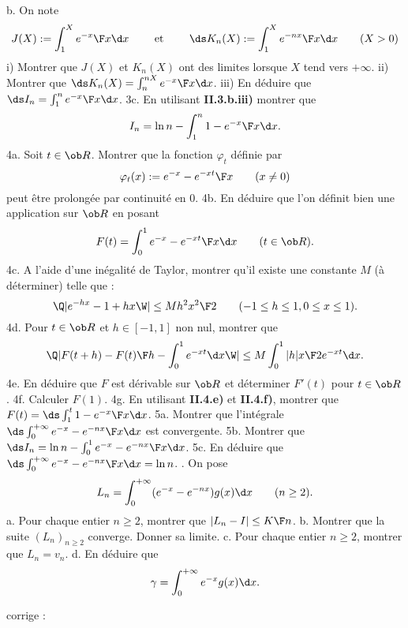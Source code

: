 \smallskip
\noindent
b. On note 
$$
J(X):=\int_1^X{e^{-x}\F x}\d x\qquad\mbox{ et } \qquad\ds K_n(X):=\int_1^X{e^{-nx}\F x}\d x\qquad(X>0)
$$
i) Montrer que $J(X)$ et $K_n(X)$ ont des limites lorsque $X$ tend vers $+\infty$.
\smallskip
\noindent
ii) Montrer que $\ds K_n(X)=\int_n^{nX}{e^{-x}\F x}\d x$.
\smallskip
\noindent
iii) En d\'eduire que $\ds I_n=\int_1^n{e^{-x}\F x}\d x$.
\smallskip
\noindent
3c. En utilisant {\bf II.3.b.iii)} montrer que 
$$
I_n=\ln n - \int_1^n{1-e^{-x}\F x}\d x.
$$
4a. Soit $t\in\ob R$.  Montrer que la fonction $\varphi_t$ d\'efinie par 
$$
\varphi _t(x):={e^{-x}-e^{-xt}\F x}\qquad (x\neq 0)
$$ 
peut \^etre prolong\'ee par continuit\'e en $0$. 
\smallskip
\noindent
4b. En d\'eduire que l'on d\'efinit bien une application sur $\ob R$ en posant 
$$
F(t)=\int_0^1{e^{-x}-e^{-xt}\F x}\d x\qquad(t\in\ob R).
$$
4c. A l'aide d'une in\'egalit\'e de Taylor, montrer qu'il existe une constante $M$ (\`a d\'eterminer) telle que :
$$
\Q|e^{-hx}-1+hx\W|\le  M{h^2x^2\F 2}\qquad (-1\le h\le 1,0\le x\le 1).
$$
4d. Pour $t \in \ob R$ et $h \in [-1,1]$ non nul, montrer que 
$$
\Q|{F(t+h)-F(t)\F h}-\int_0^1e^{-xt}\d x\W|\le M\int_0^1{|h|x\F 2}e^{-xt}\d x.
$$
4e.  En d\'eduire que $F$ est d\'erivable sur $\ob R$ et d\'eterminer $F'(t)$ pour $t \in \ob R$.
\smallskip
\noindent
4f. Calculer $F(1)$.
\smallskip
\noindent
4g. En utilisant {\bf II.4.e)} et {\bf II.4.f)}, montrer que $F(t)=\ds\int_1^t{1-e^{-x}\F x}\d x$.
\smallskip
\noindent
5a. Montrer que l'int\'egrale $\ds \int_0^{+\infty}{e^{-x}-e^{-nx}\F x}\d x$ est convergente.
\smallskip
\noindent
5b. Montrer que $\ds I_n= \ln n - \int_0^1{e^{-x}-e^{-nx}\F x}\d x$.
\smallskip
\noindent
5c. En d\'eduire que $\ds \int_0^{+\infty}{e^{-x}-e^{-nx}\F x}\d x=\ln n$.
\smallskip
{}. On pose 
$$
L_n =\int_0^{+\infty}(e^{-x}-e^{-nx})g(x)\d x\qquad(n\ge2).
$$
a. Pour chaque entier $n\ge 2$, montrer que $|L_n-I|\le{K\F n}$.
\smallskip
\noindent
b. Montrer que la suite $(L_n)_{n \ge 2}$ converge. Donner sa limite.
\smallskip
\noindent
c. Pour chaque entier $n\ge2$, montrer que $L_n=v_n$.
\smallskip
\noindent
d. En d\'eduire que 
$$
\gamma = \int_0^{+\infty}e^{-x}g(x)\d x.
$$

\bye



corrige :

